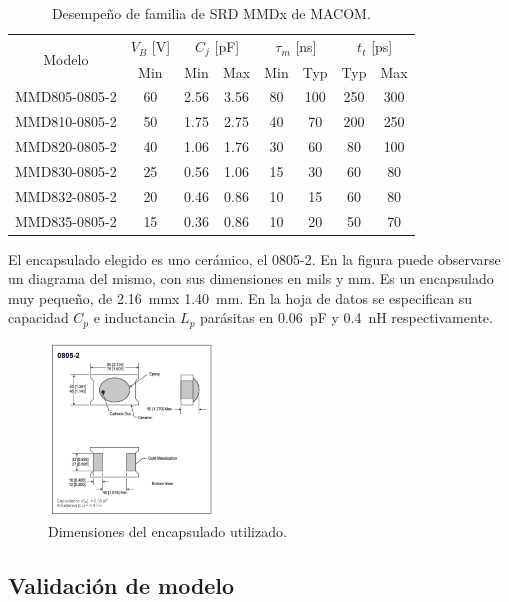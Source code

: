 \begin{table}[t]
\centering
\begin{tabular}{|c|c|c|c|c|c|c|c|}
\hline
    \multirow{2}{*}{Modelo} & $V_B$ [V] &
    \multicolumn{2}{c|}{$C_j$ [pF]} & \multicolumn{2}{c|}{$\tau_m$ [ns]} &
    \multicolumn{2}{c|}{$t_t$ [ps]} \\
\cline{2-8}
    & Min & Min & Max & Min & Typ & Typ & Max \\
\hline
MMD805-0805-2 & 60 & 2.56 & 3.56 & 80 & 100 & 250 & 300 \\
MMD810-0805-2 & 50 & 1.75 & 2.75 & 40 & 70  & 200 & 250 \\
MMD820-0805-2 & 40 & 1.06 & 1.76 & 30 & 60  & 80  & 100 \\
MMD830-0805-2 & 25 & 0.56 & 1.06 & 15 & 30  & 60  & 80 \\
MMD832-0805-2 & 20 & 0.46 & 0.86 & 10 & 15  & 60  & 80 \\
MMD835-0805-2 & 15 & 0.36 & 0.86 & 10 & 20  & 50  & 70 \\
\hline
\end{tabular}
\caption{Desempeño de familia de SRD MMDx de MACOM.}
\end{table}

El encapsulado elegido es uno cerámico, el 0805-2. En la figura puede observarse
un diagrama del mismo, con sus dimensiones en mils y mm. Es un encapsulado muy
pequeño, de \qty{2.16}{\milli\meter}x \qty{1.40}{\milli\meter}. En la hoja de
datos se especifican su capacidad $C_p$ e inductancia $L_p$ parásitas en
\qty{0.06}{\pico\farad} y \qty{0.4}{\nano\henry} respectivamente.

\begin{figure}[t]
  \centering
    \includegraphics[width=0.4\textwidth]{images/srd_0805_outline.jpg}
    \caption{Dimensiones del encapsulado utilizado.}
    \label{fig:srd_0805_outline}
\end{figure}

\subsection{Validación de modelo}

